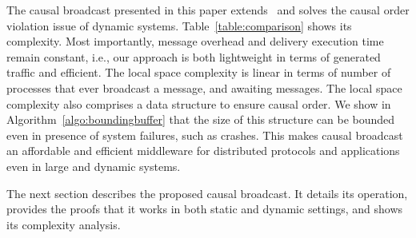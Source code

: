 The causal broadcast presented in this paper extends~\cite{friedman2004causal}
and solves the causal order violation issue of dynamic systems.
Table~\ref{table:comparison} shows its complexity. Most importantly, message
overhead and delivery execution time remain constant, i.e., our approach is both
lightweight in terms of generated traffic and efficient. The local space
complexity is linear in terms of number of processes that ever broadcast a
message, and awaiting messages.  The local space complexity also comprises a
data structure to ensure causal order. We show in
Algorithm~\ref{algo:boundingbuffer} that the size of this structure can be
bounded even in presence of system failures, such as crashes.  This makes causal
broadcast an affordable and efficient middleware for distributed protocols and
applications even in large and dynamic systems.

The next section describes the proposed causal broadcast. It details its
operation, provides the proofs that it works in both static and dynamic
settings, and shows its complexity analysis.

